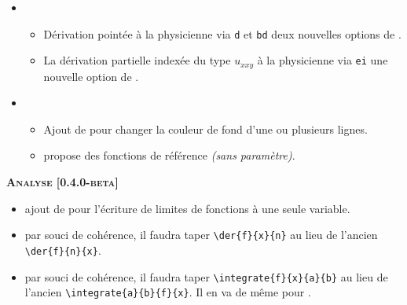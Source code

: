 \begin{itemize}[itemsep=.5em]
    \item {}
    \begin{itemize}[itemsep=.5em]
        \item Dérivation pointée à la physicienne via \verb+d+ et \verb+bd+ deux nouvelles options de .

        \item La dérivation partielle indexée du type $u_{xxy}$ à la physicienne via \verb+ei+ une nouvelle option de .
    \end{itemize}



    


    \item {}
    \begin{itemize}[itemsep=.5em]
        \item Ajout de  pour changer la couleur de fond d'une ou plusieurs lignes.


        \item {} propose des fonctions de référence \emph{(sans paramètre)}.
    \end{itemize}



    
\end{itemize}


\begin{center}
    \textbf{\textsc{Analyse [0.4.0-beta]}}
\end{center}

\begin{itemize}[itemsep=.5em]
    \item {}
          ajout de  pour l'écriture de limites de fonctions à une seule variable.


    

    \item {}
          par souci de cohérence, il faudra taper \verb#\der{f}{x}{n}# au lieu de l'ancien \verb#\der{f}{n}{x}#.


    

    \item {}
          par souci de cohérence, il faudra taper \verb#\integrate{f}{x}{a}{b}# au lieu de l'ancien \verb#\integrate{a}{b}{f}{x}#.
          Il en va de même pour .


    
\end{itemize}


